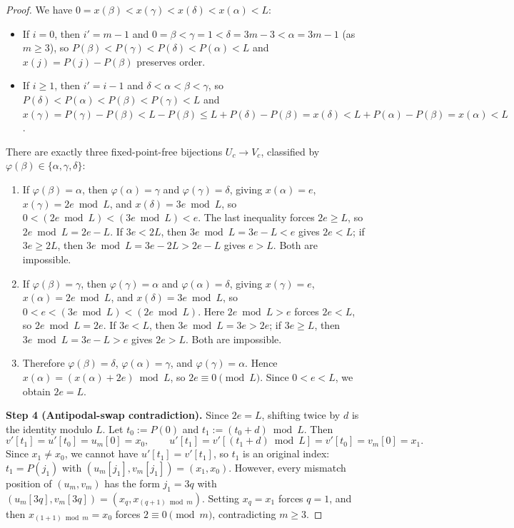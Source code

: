 \documentclass[11pt]{article}
\begin{document}
\begin{proof}
We have $0 = x(\beta) < x(\gamma) < x(\delta) < x(\alpha) < L$:
\begin{itemize}
  \item If $i = 0$, then $i' = m - 1$ and $0 = \beta < \gamma = 1 < \delta =
    3m - 3 < \alpha = 3m - 1$ (as $m \ge 3$), so $P(\beta) < P(\gamma) <
    P(\delta) < P(\alpha) < L$ and $x(j) = P(j) - P(\beta)$ preserves order.
  \item If $i \ge 1$, then $i' = i - 1$ and $\delta < \alpha < \beta < \gamma$,
    so $P(\delta) < P(\alpha) < P(\beta) < P(\gamma) < L$ and
    $x(\gamma) = P(\gamma) - P(\beta) < L - P(\beta) \le L + P(\delta) -
    P(\beta) = x(\delta) < L + P(\alpha) - P(\beta) = x(\alpha) < L$.
\end{itemize}
There are exactly three fixed-point-free bijections $U_c \to V_c$, classified
by $\varphi(\beta) \in \{\alpha, \gamma, \delta\}$:
\begin{enumerate}
  \item If $\varphi(\beta) = \alpha$, then $\varphi(\alpha) = \gamma$ and
    $\varphi(\gamma) = \delta$, giving $x(\alpha) = e$, $x(\gamma) = 2e \bmod L$,
    and $x(\delta) = 3e \bmod L$, so $0 < (2e \bmod L) < (3e \bmod L) < e$.
    The last inequality forces $2e \ge L$, so $2e \bmod L = 2e - L$. If
    $3e < 2L$, then $3e \bmod L = 3e - L < e$ gives $2e < L$; if $3e \ge 2L$,
    then $3e \bmod L = 3e - 2L > 2e - L$ gives $e > L$. Both are impossible.
  \item If $\varphi(\beta) = \gamma$, then $\varphi(\gamma) = \alpha$ and
    $\varphi(\alpha) = \delta$, giving $x(\gamma) = e$, $x(\alpha) = 2e \bmod L$,
    and $x(\delta) = 3e \bmod L$, so $0 < e < (3e \bmod L) < (2e \bmod L)$.
    Here $2e \bmod L > e$ forces $2e < L$, so $2e \bmod L = 2e$. If $3e < L$,
    then $3e \bmod L = 3e > 2e$; if $3e \ge L$, then $3e \bmod L = 3e - L > e$
    gives $2e > L$. Both are impossible.
  \item Therefore $\varphi(\beta) = \delta$, $\varphi(\alpha) = \gamma$, and
    $\varphi(\gamma) = \alpha$. Hence $x(\alpha) = (x(\alpha) + 2e) \bmod L$,
    so $2e \equiv 0 \pmod{L}$. Since $0 < e < L$, we obtain $2e = L$.
\end{enumerate}

\medskip
\noindent\textbf{Step 4 (Antipodal-swap contradiction).}
Since $2e = L$, shifting twice by $d$ is the identity modulo $L$. Let
$t_0 := P(0)$ and $t_1 := (t_0 + d) \bmod L$. Then
\[
v'[t_1] = u'[t_0] = u_m[0] = x_0, \qquad
u'[t_1] = v'[(t_1 + d) \bmod L] = v'[t_0] = v_m[0] = x_1.
\]
Since $x_1 \ne x_0$, we cannot have $u'[t_1] = v'[t_1]$, so $t_1$ is an
original index: $t_1 = P(j_1)$ with $(u_m[j_1], v_m[j_1]) = (x_1, x_0)$.
However, every mismatch position of $(u_m, v_m)$ has the form $j_1 = 3q$ with
$(u_m[3q], v_m[3q]) = (x_q, x_{(q+1) \bmod m})$. Setting $x_q = x_1$ forces
$q = 1$, and then $x_{(1+1) \bmod m} = x_0$ forces $2 \equiv 0 \pmod{m}$,
contradicting $m \ge 3$.
\end{proof}
\end{document}
